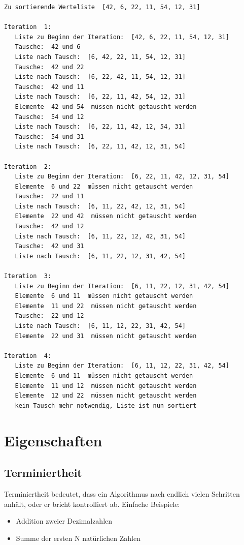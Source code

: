 \documentclass[
  letterpaper,
  DIV=11,
  numbers=noendperiod]{scrreprt}
\providecommand{\tightlist}{%
  \setlength{\itemsep}{0pt}\setlength{\parskip}{0pt}}\usepackage{longtable,booktabs,array}
\begin{document}
\begin{verbatim}
Zu sortierende Werteliste  [42, 6, 22, 11, 54, 12, 31]

Iteration  1: 
   Liste zu Beginn der Iteration:  [42, 6, 22, 11, 54, 12, 31]
   Tausche:  42 und 6
   Liste nach Tausch:  [6, 42, 22, 11, 54, 12, 31]
   Tausche:  42 und 22
   Liste nach Tausch:  [6, 22, 42, 11, 54, 12, 31]
   Tausche:  42 und 11
   Liste nach Tausch:  [6, 22, 11, 42, 54, 12, 31]
   Elemente  42 und 54  müssen nicht getauscht werden
   Tausche:  54 und 12
   Liste nach Tausch:  [6, 22, 11, 42, 12, 54, 31]
   Tausche:  54 und 31
   Liste nach Tausch:  [6, 22, 11, 42, 12, 31, 54]

Iteration  2: 
   Liste zu Beginn der Iteration:  [6, 22, 11, 42, 12, 31, 54]
   Elemente  6 und 22  müssen nicht getauscht werden
   Tausche:  22 und 11
   Liste nach Tausch:  [6, 11, 22, 42, 12, 31, 54]
   Elemente  22 und 42  müssen nicht getauscht werden
   Tausche:  42 und 12
   Liste nach Tausch:  [6, 11, 22, 12, 42, 31, 54]
   Tausche:  42 und 31
   Liste nach Tausch:  [6, 11, 22, 12, 31, 42, 54]

Iteration  3: 
   Liste zu Beginn der Iteration:  [6, 11, 22, 12, 31, 42, 54]
   Elemente  6 und 11  müssen nicht getauscht werden
   Elemente  11 und 22  müssen nicht getauscht werden
   Tausche:  22 und 12
   Liste nach Tausch:  [6, 11, 12, 22, 31, 42, 54]
   Elemente  22 und 31  müssen nicht getauscht werden

Iteration  4: 
   Liste zu Beginn der Iteration:  [6, 11, 12, 22, 31, 42, 54]
   Elemente  6 und 11  müssen nicht getauscht werden
   Elemente  11 und 12  müssen nicht getauscht werden
   Elemente  12 und 22  müssen nicht getauscht werden
   kein Tausch mehr notwendig, Liste ist nun sortiert
\end{verbatim}

\chapter{Eigenschaften}\label{eigenschaften}

\section{Terminiertheit}\label{terminiertheit}

Terminiertheit bedeutet, dass ein Algorithmus nach endlich vielen
Schritten anhält, oder er bricht kontrolliert ab. Einfache Beispiele:

\begin{itemize}
\tightlist
\item
  Addition zweier Dezimalzahlen
\item
  Summe der ersten N natürlichen Zahlen
\end{itemize}
\end{document}
